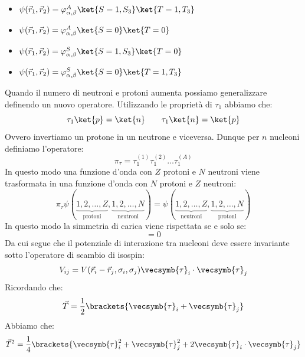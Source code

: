 \begin{itemize}
 \item $\psi(\vec{r}_1,\vec{r}_2) = \varphi_{\alpha,\beta}^A \ket{S=1,S_3} \ket{T=1,T_3}$
 \item $\psi(\vec{r}_1,\vec{r}_2) = \varphi_{\alpha,\beta}^A \ket{S=0} \ket{T=0}$
 \item $\psi(\vec{r}_1,\vec{r}_2) = \varphi_{\alpha,\beta}^S \ket{S=1,S_3} \ket{T=0}$
 \item $\psi(\vec{r}_1,\vec{r}_2) = \varphi_{\alpha,\beta}^S \ket{S=0} \ket{T=1,T_3}$
\end{itemize}
Quando il numero di neutroni e protoni aumenta possiamo generalizzare definendo un nuovo operatore. Utilizzando le proprietà di $\tau_1$ abbiamo che:
\begin{equation}
 \tau_1 \ket{p} = \ket{n} \qquad \tau_1 \ket{n} = \ket{p}
\end{equation}
Ovvero invertiamo un protone in un neutrone e viceversa. Dunque per $n$ nucleoni definiamo l'operatore:
\begin{equation}
 \pi_\tau = \tau_1^{(1)}\tau_1^{(2)}\dots\tau_1^{(A)}
\end{equation}
In questo modo una funzione d'onda con $Z$ protoni e $N$ neutroni viene trasformata in una funzione d'onda con $N$ protoni e $Z$ neutroni:
\begin{equation}
 \pi_\tau \psi(\underbrace{1,2,\dots,Z}_{\text{protoni}},\underbrace{1,2,\dots,N}_{\text{neutroni}}) = \psi(\underbrace{1,2,\dots,Z}_{\text{neutroni}},\underbrace{1,2,\dots,N}_{\text{protoni}})
\end{equation}
In questo modo la simmetria di carica viene rispettata se e solo se:
\begin{equation}
  [\pi_\tau, H] = 0
\end{equation}
Da cui segue che il potenziale di interazione tra nucleoni deve essere invariante sotto l'operatore di scambio di isospin:
\begin{equation}
  V_{ij} = V(\vec{r}_i - \vec{r}_j, \sigma_i, \sigma_j)\vecsymb{\tau}_i \cdot \vecsymb{\tau}_j
\end{equation}
Ricordando che:
\begin{equation}
  \vec{T} = \dfrac{1}{2} \brackets{\vecsymb{\tau}_i + \vecsymb{\tau}_j}
\end{equation}
Abbiamo che:
\begin{equation}
  \vec{T}^2 = \dfrac{1}{4} \brackets{\vecsymb{\tau}_i^2 + \vecsymb{\tau}_j^2 + 2 \vecsymb{\tau}_i \cdot \vecsymb{\tau}_j}
\end{equation}
